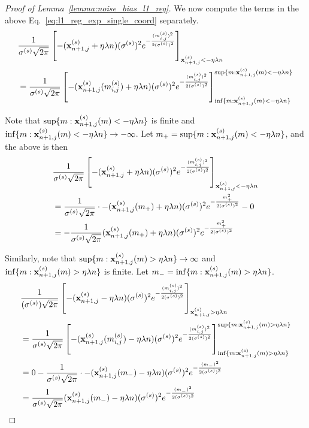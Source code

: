 \begin{proof}[Proof of Lemma~\ref{lemma:noise_bias_l1_reg}]
We now compute the terms in the above Eq.~\ref{eq:l1_reg_exp_single_coord} separately.
\begin{align}
    &\frac{1}{\sigma^{(s)} \sqrt{2\pi}}\left[ -({\mathbf{x}}_{n+1,j}^{(s)} + \eta \lambda n) (\sigma^{(s)})^2 e^{-\frac{(m_{i,j}^{(s)})^2}{2 (\sigma^{(s)})^2}}  \right]_{{\mathbf{x}}_{n+1,j}^{(s)} < - \eta \lambda n}\\
    \nonumber
    &= \frac{1}{\sigma^{(s)} \sqrt{2\pi}}\left[ -({\mathbf{x}}_{n+1,j}^{(s)}(m_{i,j}^{(s)}) + \eta \lambda n) (\sigma^{(s)})^2 e^{-\frac{(m_{i,j}^{(s)})^2}{2 (\sigma^{(s)})^2}}  \right]_{\inf\{m: {\mathbf{x}}_{n+1,j}^{(s)}(m) < - \eta \lambda n\}}^{\sup\{m: {\mathbf{x}}_{n+1,j}^{(s)}(m) < - \eta \lambda n\}}
\end{align}

Note that $\sup\{m: {\mathbf{x}}_{n+1,j}^{(s)}(m) < - \eta \lambda n\}$ is finite and $\inf\{m: {\mathbf{x}}_{n+1,j}^{(s)}(m) < - \eta \lambda n\} \rightarrow -\infty$. Let $m_{+} = \sup\{m: {\mathbf{x}}_{n+1,j}^{(s)}(m) < - \eta \lambda n\}$, and the above is then
\begin{align}
    &\frac{1}{\sigma^{(s)} \sqrt{2\pi}}\left[ -({\mathbf{x}}_{n+1,j}^{(s)} + \eta \lambda n) (\sigma^{(s)})^2 e^{-\frac{(m_{i,j}^{(s)})^2}{2 (\sigma^{(s)})^2}}  \right]_{{\mathbf{x}}_{n+1,j}^{(s)} < - \eta \lambda n}\\
    \nonumber
    &= \frac{1}{\sigma^{(s)} \sqrt{2\pi}}\cdot -({\mathbf{x}}_{n+1,j}^{(s)}(m_{+}) + \eta \lambda n) (\sigma^{(s)})^2 e^{-\frac{m_{+}^2}{2 (\sigma^{(s)})^2}} - 0\\
\label{eq:l1_reg_t1}
    &= -\frac{1}{\sigma^{(s)} \sqrt{2\pi}}({\mathbf{x}}_{n+1,j}^{(s)}(m_{+}) + \eta \lambda n) (\sigma^{(s)})^2 e^{-\frac{m_{+}^2}{2 (\sigma^{(s)})^2}}
\end{align}

Similarly, note that $\sup\{m: {\mathbf{x}}_{n+1,j}^{(s)}(m) > \eta \lambda n\}\rightarrow \infty$ and $\inf\{m: {\mathbf{x}}_{n+1,j}^{(s)}(m) > \eta \lambda n\}$ is finite. Let $m_{-} = \inf\{m: {\mathbf{x}}_{n+1,j}^{(s)}(m) > \eta \lambda n\}$.
\begin{align}
    &\frac{1}{(\sigma^{(s)}) \sqrt{2\pi}}
    \left[ -({\mathbf{x}}_{n+1,j}^{(s)} - \eta \lambda n) (\sigma^{(s)})^2 e^{-\frac{(m_{i,j}^{(s)})^2}{2 (\sigma^{(s)})^2}} \right]_{{\mathbf{x}}_{n+1,j}^{(s)} > \eta \lambda n}\\
    \nonumber
    &= \frac{1}{\sigma^{(s)} \sqrt{2\pi}}
    \left[ -({\mathbf{x}}_{n+1,j}^{(s)}(m_{i,j}^{(s)}) - \eta \lambda n) (\sigma^{(s)})^2 e^{-\frac{(m_{i,j}^{(s)})^2}{2 (\sigma^{(s)})^2}} \right]_{\inf\{m: {\mathbf{x}}_{n+1,j}^{(s)}(m) > \eta \lambda n\}}^{\sup\{m: {\mathbf{x}}_{n+1,j}^{(s)}(m) > \eta \lambda n\} }\\
    &= 0 - \frac{1}{\sigma^{(s)} \sqrt{2\pi}}\cdot -({\mathbf{x}}_{n+1,j}^{(s)}(m_{-}) - \eta \lambda n) (\sigma^{(s)})^2 e^{-\frac{(m_{-})^2}{2 (\sigma^{(s)})^2}}\\
\label{eq:l1_reg_t2}
    &= \frac{1}{\sigma^{(s)} \sqrt{2\pi}} ({\mathbf{x}}_{n+1,j}^{(s)}(m_{-}) - \eta \lambda n) (\sigma^{(s)})^2 e^{-\frac{(m_{-})^{2}}{2 (\sigma^{(s)})^2}}
\end{align}


\end{proof}
